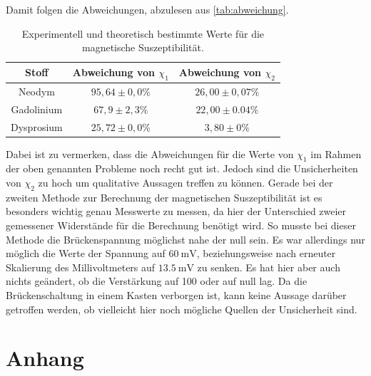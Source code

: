 \noindent
Damit folgen die Abweichungen, abzulesen aus \autoref{tab:abweichung}.
\begin{table}[H]
    \centering
    \caption{Experimentell und theoretisch bestimmte Werte für die magnetische Suszeptibilität.}
    \label{tab:abweichung}
    \begin{tabular}{c| c c}
        \toprule
        Stoff & Abweichung von $\chi_1$ & Abweichung von $\chi_2$ \\
        \midrule
        Neodym &  $95,64 \pm 0,0 \%$ & $26,00 \pm 0,07 \%$ \\
        Gadolinium & $67,9 \pm 2,3 \%$ & $22,00 \pm 0.04 \%$ \\
        Dysprosium & $25,72 \pm 0,0\%$ & $3,80 \pm 0 \%$ \\
      \bottomrule
    \end{tabular}
\end{table}


\noindent
Dabei ist zu vermerken, dass die Abweichungen für die Werte von $\chi_1$ im Rahmen der oben genannten Probleme noch recht gut ist. Jedoch sind die Unsicherheiten von $\chi_2$ zu hoch um qualitative Aussagen treffen zu können.
Gerade bei der zweiten Methode zur Berechnung der magnetischen Suszeptibilität ist es besonders wichtig genau Messwerte zu messen, da hier der Unterschied zweier gemessener Widerstände für die Berechnung benötigt wird. So musste bei dieser Methode
die Brückenspannung möglichst nahe der null sein. Es war allerdings nur möglich die Werte der Spannung auf $\SI{60}{\milli\volt}$, beziehungsweise nach erneuter Skalierung des Millivoltmeters auf
$\SI{13,5}{\milli\volt}$ zu senken. Es hat hier aber auch nichts geändert, ob die Verstärkung auf 100 oder auf null lag.
Da die Brückenschaltung in einem Kasten verborgen ist, kann keine Aussage darüber getroffen werden, ob vielleicht hier noch mögliche Quellen der Unsicherheit sind.


\section{Anhang}
\label{sec:Anhang}

